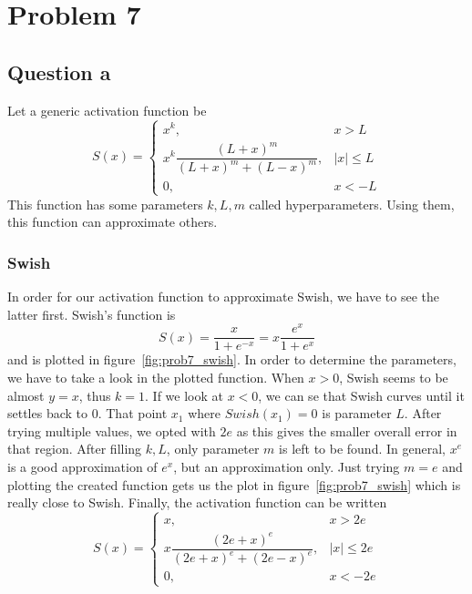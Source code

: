 \section{Problem 7}
\subsection{Question a}
Let a generic activation function be
\begin{equation}
S(x) = \left\{
\begin{array}{cc}
	x^k, & x>L\\[1mm]
	x^k \dfrac{\left(L+x\right)^m}{\left(L+x\right)^m + \left(L-x\right)^m}, & \left|x\right| \le L\\[1mm]
	0, & x < -L
\end{array}
\right.
\end{equation}
This function has some parameters $k,L,m$ called hyperparameters. Using them, this function can approximate others.

\subsubsection{Swish}
In order for our activation function to approximate Swish, we have to see the latter first.
Swish's function is 
\[
S(x) = \dfrac{x}{1+e^{-x}} = x\dfrac{e^x}{1+e^x}
\]
and is plotted in figure~\ref{fig:prob7_swish}. In order to determine the parameters, we have to take a look in the plotted function. When $x>0$, Swish seems to be almost $y=x$, thus $k=1$. If we look at $x<0$, we can se that Swish curves until it settles back to 0.
That point $x_1$ where $Swish (x_1) = 0$ is parameter $L$. After trying multiple values, we opted with $2e$ as this gives the smaller overall error in that region.
After filling $k,L$, only parameter $m$ is left to be found. In general, $x^e$ is a good approximation of $e^x$, but an approximation only. Just trying $m=e$ and plotting the created function gets us the plot in figure~\ref{fig:prob7_swish} which is really close to Swish.
Finally, the activation function can be written 
\[
S(x) = \left\{
\begin{array}{cc}
	x, & x>2e\\[1mm]
	x \dfrac{\left(2e+x\right)^e}{\left(2e+x\right)^e + \left(2e-x\right)^e}, & \left|x\right| \le 2e\\[1mm]
	0, & x < -2e
\end{array}
\right.
\]


